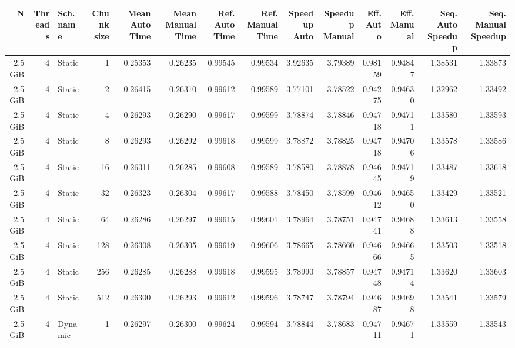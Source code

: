         \begin{table}[H]
            \centering
            \begin{adjustbox}{width=\textwidth, keepaspectratio}
                \begin{tabular}{rrlrrrrrrrrrrr}
                    \toprule
                    N & Threads & Sch. name & Chunk size & Mean Auto Time & Mean Manual Time & Ref. Auto Time & Ref. Manual Time & Speedup Auto & Speedup Manual & Eff. Auto & Eff. Manual & Seq. Auto Speedup & Seq. Manual Speedup \\
                    \midrule
                    2.5 GiB & 4 & Static & 1 & 0.25353 & 0.26235 & 0.99545 & 0.99534 & 3.92635 & 3.79389 & 0.98159 & 0.94847 & 1.38531 & 1.33873 \\
                    2.5 GiB & 4 & Static & 2 & 0.26415 & 0.26310 & 0.99612 & 0.99589 & 3.77101 & 3.78522 & 0.94275 & 0.94630 & 1.32962 & 1.33492 \\
                    2.5 GiB & 4 & Static & 4 & 0.26293 & 0.26290 & 0.99617 & 0.99599 & 3.78874 & 3.78846 & 0.94718 & 0.94711 & 1.33580 & 1.33593 \\
                    2.5 GiB & 4 & Static & 8 & 0.26293 & 0.26292 & 0.99618 & 0.99599 & 3.78872 & 3.78825 & 0.94718 & 0.94706 & 1.33578 & 1.33586 \\
                    2.5 GiB & 4 & Static & 16 & 0.26311 & 0.26285 & 0.99608 & 0.99589 & 3.78580 & 3.78878 & 0.94645 & 0.94719 & 1.33487 & 1.33618 \\
                    2.5 GiB & 4 & Static & 32 & 0.26323 & 0.26304 & 0.99617 & 0.99588 & 3.78450 & 3.78599 & 0.94612 & 0.94650 & 1.33429 & 1.33521 \\
                    2.5 GiB & 4 & Static & 64 & 0.26286 & 0.26297 & 0.99615 & 0.99601 & 3.78964 & 3.78751 & 0.94741 & 0.94688 & 1.33613 & 1.33558 \\
                    2.5 GiB & 4 & Static & 128 & 0.26308 & 0.26305 & 0.99619 & 0.99606 & 3.78665 & 3.78660 & 0.94666 & 0.94665 & 1.33503 & 1.33518 \\
                    2.5 GiB & 4 & Static & 256 & 0.26285 & 0.26288 & 0.99618 & 0.99595 & 3.78990 & 3.78857 & 0.94748 & 0.94714 & 1.33620 & 1.33603 \\
                    2.5 GiB & 4 & Static & 512 & 0.26300 & 0.26293 & 0.99612 & 0.99596 & 3.78747 & 3.78794 & 0.94687 & 0.94698 & 1.33541 & 1.33579 \\
                    2.5 GiB & 4 & Dynamic & 1 & 0.26297 & 0.26300 & 0.99624 & 0.99594 & 3.78844 & 3.78683 & 0.94711 & 0.94671 & 1.33559 & 1.33543 \\

\end{tabular}
\end{adjustbox}
\end{table}
